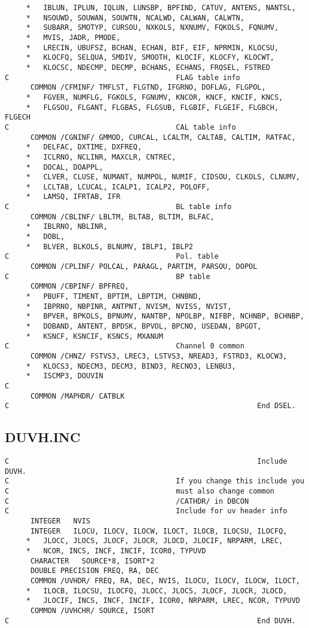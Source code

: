 \begin{verbatim}
     *   IBLUN, IPLUN, IQLUN, LUNSBP, BPFIND, CATUV, ANTENS, NANTSL,
     *   NSOUWD, SOUWAN, SOUWTN, NCALWD, CALWAN, CALWTN,
     *   SUBARR, SMOTYP, CURSOU, NXKOLS, NXNUMV, FQKOLS, FQNUMV,
     *   MVIS, JADR, PMODE,
     *   LRECIN, UBUFSZ, BCHAN, ECHAN, BIF, EIF, NPRMIN, KLOCSU,
     *   KLOCFQ, SELQUA, SMDIV, SMOOTH, KLOCIF, KLOCFY, KLOCWT,
     *   KLOCSC, NDECMP, DECMP, BCHANS, ECHANS, FRQSEL, FSTRED
C                                       FLAG table info
      COMMON /CFMINF/ TMFLST, FLGTND, IFGRNO, DOFLAG, FLGPOL,
     *   FGVER, NUMFLG, FGKOLS, FGNUMV, KNCOR, KNCF, KNCIF, KNCS,
     *   FLGSOU, FLGANT, FLGBAS, FLGSUB, FLGBIF, FLGEIF, FLGBCH, FLGECH
C                                       CAL table info
      COMMON /CGNINF/ GMMOD, CURCAL, LCALTM, CALTAB, CALTIM, RATFAC,
     *   DELFAC, DXTIME, DXFREQ,
     *   ICLRNO, NCLINR, MAXCLR, CNTREC,
     *   DOCAL, DOAPPL,
     *   CLVER, CLUSE, NUMANT, NUMPOL, NUMIF, CIDSOU, CLKOLS, CLNUMV,
     *   LCLTAB, LCUCAL, ICALP1, ICALP2, POLOFF,
     *   LAMSQ, IFRTAB, IFR
C                                       BL table info
      COMMON /CBLINF/ LBLTM, BLTAB, BLTIM, BLFAC,
     *   IBLRNO, NBLINR,
     *   DOBL,
     *   BLVER, BLKOLS, BLNUMV, IBLP1, IBLP2
C                                       Pol. table
      COMMON /CPLINF/ POLCAL, PARAGL, PARTIM, PARSOU, DOPOL
C                                       BP table
      COMMON /CBPINF/ BPFREQ,
     *   PBUFF, TIMENT, BPTIM, LBPTIM, CHNBND,
     *   IBPRNO, NBPINR, ANTPNT, NVISM, NVISS, NVIST,
     *   BPVER, BPKOLS, BPNUMV, NANTBP, NPOLBP, NIFBP, NCHNBP, BCHNBP,
     *   DOBAND, ANTENT, BPDSK, BPVOL, BPCNO, USEDAN, BPGOT,
     *   KSNCF, KSNCIF, KSNCS, MXANUM
C                                       Channel 0 common
      COMMON /CHNZ/ FSTVS3, LREC3, LSTVS3, NREAD3, FSTRD3, KLOCW3,
     *   KLOCS3, NDECM3, DECM3, BIND3, RECNO3, LENBU3,
     *   ISCMP3, DOUVIN
C
      COMMON /MAPHDR/ CATBLK
C                                                          End DSEL.
\end{verbatim}

\subsection{DUVH.INC}
\begin{verbatim}
C                                                          Include DUVH.
C                                       If you change this include you
C                                       must also change common
C                                       /CATHDR/ in DBCON
C                                       Include for uv header info
      INTEGER   NVIS
      INTEGER   ILOCU, ILOCV, ILOCW, ILOCT, ILOCB, ILOCSU, ILOCFQ,
     *   JLOCC, JLOCS, JLOCF, JLOCR, JLOCD, JLOCIF, NRPARM, LREC,
     *   NCOR, INCS, INCF, INCIF, ICOR0, TYPUVD
      CHARACTER   SOURCE*8, ISORT*2
      DOUBLE PRECISION FREQ, RA, DEC
      COMMON /UVHDR/ FREQ, RA, DEC, NVIS, ILOCU, ILOCV, ILOCW, ILOCT,
     *   ILOCB, ILOCSU, ILOCFQ, JLOCC, JLOCS, JLOCF, JLOCR, JLOCD,
     *   JLOCIF, INCS, INCF, INCIF, ICOR0, NRPARM, LREC, NCOR, TYPUVD
      COMMON /UVHCHR/ SOURCE, ISORT
C                                                          End DUVH.
\end{verbatim}


